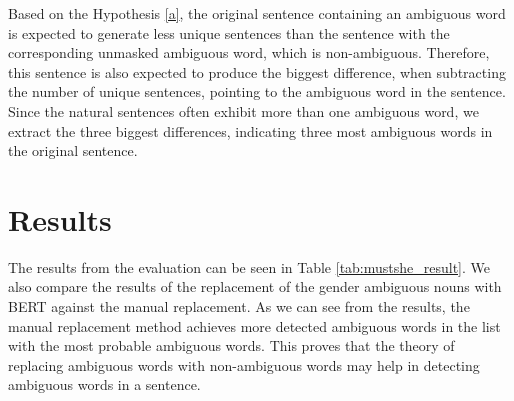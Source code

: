Based on the Hypothesis \ref{a}, the original sentence containing an ambiguous word is expected to generate less unique sentences than the sentence with the corresponding unmasked ambiguous word, which is non-ambiguous. Therefore, this sentence is also expected to produce the biggest difference, when subtracting the number of unique sentences, pointing to the ambiguous word in the sentence. Since the natural sentences often exhibit more than one ambiguous word, we extract the three biggest differences, indicating three most ambiguous words in the original sentence.

\section{Results}
\label{sec:Real_Experiment:Results}

The results from the evaluation can be seen in Table \ref{tab:mustshe_result}. We also compare the results of the replacement of the gender ambiguous nouns with BERT against the manual replacement. As we can see from the results, the manual replacement method achieves more detected ambiguous words in the list with the most probable ambiguous words. This proves that the theory of replacing ambiguous words with non-ambiguous words may help in detecting ambiguous words in a sentence. 


